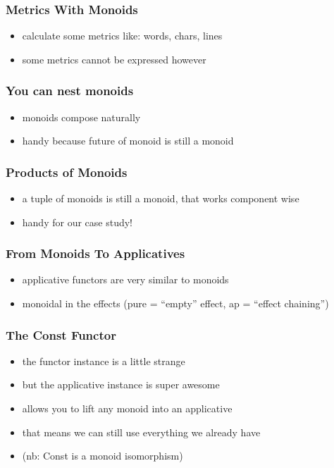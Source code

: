 \documentclass{beamer}
\begin{document}
\begin{frame}
  \frametitle{Metrics With Monoids}
  \begin{itemize}
  \item calculate some metrics like: words, chars, lines
  \item some metrics cannot be expressed however
  \end{itemize}
\end{frame}

\begin{frame}
  \frametitle{You can nest monoids}
  \begin{itemize}
  \item monoids compose naturally
  \item handy because future of monoid is still a monoid
  \end{itemize}
\end{frame}

\begin{frame}
  \frametitle{Products of Monoids}
  \begin{itemize}
  \item a tuple of monoids is still a monoid, that works component wise
  \item handy for our case study!
  \end{itemize}
\end{frame}

\begin{frame}
  \frametitle{From Monoids To Applicatives}
  \begin{itemize}
  \item applicative functors are very similar to monoids
  \item monoidal in the effects (pure = ``empty'' effect, ap = ``effect chaining'')
  \end{itemize}
\end{frame}

\begin{frame}
  \frametitle{The Const Functor}
  \begin{itemize}
  \item the functor instance is a little strange
  \item but the applicative instance is super awesome
  \item allows you to lift any monoid into an applicative
  \item that means we can still use everything we already have
  \item (nb: Const is a monoid isomorphism)
  \end{itemize}
\end{frame}
\end{document}
